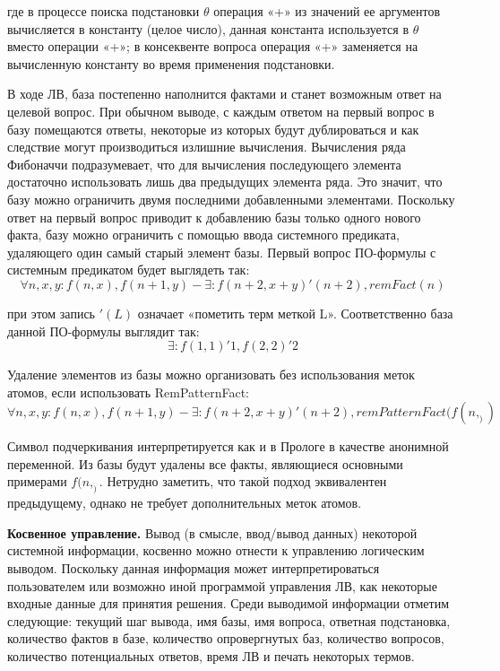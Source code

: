 где в процессе поиска подстановки $\theta$ операция «+» из значений ее аргументов вычисляется в константу (целое число), данная константа используется в $\theta$ вместо операции «+»; в консеквенте вопроса операция «+» заменяется на вычисленную константу во время применения подстановки.

В ходе ЛВ, база постепенно наполнится фактами и станет возможным ответ на целевой вопрос. При обычном выводе, с каждым ответом на первый вопрос в базу помещаются ответы, некоторые из которых будут дублироваться и как следствие могут производиться излишние вычисления. Вычисления ряда Фибоначчи подразумевает, что для вычисления последующего элемента достаточно использовать лишь два предыдущих элемента ряда. Это значит, что базу можно ограничить двумя последними добавленными элементами. Поскольку ответ на первый вопрос приводит к добавлению базы только одного нового факта, базу можно ограничить с помощью ввода системного предиката, удаляющего один самый старый элемент базы. Первый вопрос ПО-формулы с системным предикатом будет выглядеть так:
\begin{equation}
	\forall n,x,y\colon f(n,x),f(n+1,y) - \exists\colon f(n+2,x+y)'(n+2), remFact(n)
\end{equation}

при этом запись $'(L)$ означает «пометить терм меткой L». Соответственно база данной ПО-формулы выглядит так:
\begin{equation}
\exists\colon f(1,1)'1, f(2,2)'2
\end{equation}

Удаление элементов из базы можно организовать без использования меток атомов, если использовать RemPatternFact:
\begin{equation}
	\forall n,x,y\colon f(n,x),f(n+1,y) - \exists\colon f(n+2,x+y)'(n+2), remPatternFact(f(n,_))
\end{equation}

Символ подчеркивания интерпретируется как и в Прологе в качестве анонимной переменной. Из базы будут удалены все факты, являющиеся основными примерами  $f(n,_)$. Нетрудно заметить, что такой подход эквивалентен предыдущему, однако не требует дополнительных меток атомов.

\textbf{Косвенное управление.} Вывод (в смысле, ввод/вывод данных) некоторой системной информации, косвенно можно отнести к управлению логическим выводом. Поскольку данная информация может интерпретироваться пользователем или возможно иной программой управления ЛВ, как некоторые входные данные для принятия решения. Среди выводимой информации отметим следующие: текущий шаг вывода, имя базы, имя вопроса, ответная подстановка, количество фактов в базе, количество опровергнутых баз, количество вопросов, количество потенциальных ответов, время ЛВ и печать некоторых термов.

